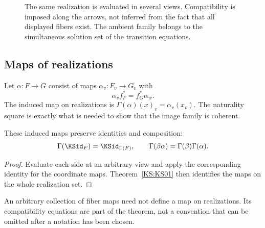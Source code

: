 \begin{figure}[htbp]\centering{}\caption{The same realization is evaluated in several views. Compatibility is imposed along the arrows, not inferred from the fact that all displayed fibers exist. The ambient family belongs to the simultaneous solution set of the transition equations.}\label{KS:fig:views}\end{figure}

\subsection{Maps of realizations}
Let \(\alpha:F\to G\) consist of maps \(\alpha_v:F_v\to G_v\) with
\[
 \alpha_v f_F^*=f_G^*\alpha_w.
\]
The induced map on realizations is \(\Gamma(\alpha)(x)_v=\alpha_v(x_v)\). The naturality square is exactly what is needed to show that the image family is coherent.

\begin{KSproposition}\label{KS:KS02}
These induced maps preserve identities and composition:
\[
 \Gamma(\KSid_F)=\KSid_{\Gamma(F)},\qquad
 \Gamma(\beta\alpha)=\Gamma(\beta)\Gamma(\alpha).
\]
\end{KSproposition}
\begin{proof}
Evaluate each side at an arbitrary view and apply the corresponding identity for the coordinate maps. Theorem~\ref{KS:KS01} then identifies the maps on the whole realization set.
\end{proof}
An arbitrary collection of fiber maps need not define a map on realizations. Its compatibility equations are part of the theorem, not a convention that can be omitted after a notation has been chosen.

